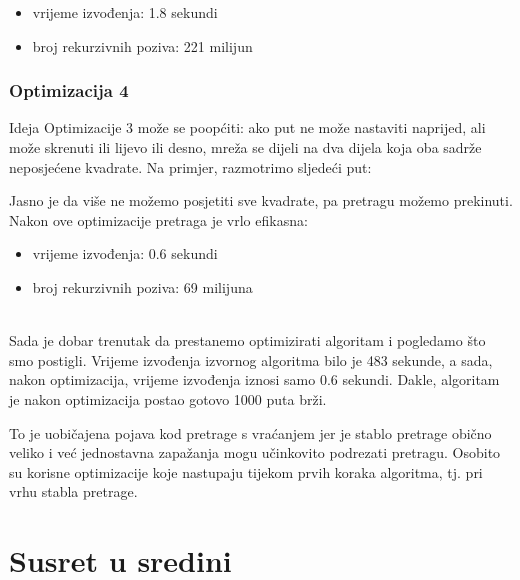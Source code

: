 \begin{itemize}
\item
vrijeme izvođenja: 1.8 sekundi
\item
broj rekurzivnih poziva: 221 milijun
\end{itemize}

\subsubsection{Optimizacija 4}

Ideja Optimizacije 3
može se poopćiti:
ako put ne može nastaviti naprijed,
ali može skrenuti ili lijevo ili desno,
mreža se dijeli na dva dijela
koja oba sadrže neposjećene kvadrate.
Na primjer, razmotrimo sljedeći put:

\begin{center}
\end{center}
Jasno je da više ne možemo posjetiti sve kvadrate,
pa pretragu možemo prekinuti.
Nakon ove optimizacije pretraga je
vrlo efikasna:

\begin{itemize}
\item
vrijeme izvođenja: 0.6 sekundi
\item
broj rekurzivnih poziva: 69 milijuna
\end{itemize}

~\\
Sada je dobar trenutak da prestanemo optimizirati
algoritam i pogledamo što smo postigli.
Vrijeme izvođenja izvornog algoritma
bilo je 483 sekunde,
a sada, nakon optimizacija,
vrijeme izvođenja iznosi samo 0.6 sekundi.
Dakle, algoritam je nakon optimizacija postao
gotovo 1000 puta brži.

To je uobičajena pojava kod pretrage s vraćanjem
jer je stablo pretrage obično veliko
i već jednostavna zapažanja mogu učinkovito
podrezati pretragu.
Osobito su korisne optimizacije koje
nastupaju tijekom prvih koraka algoritma,
tj. pri vrhu stabla pretrage.

\section{Susret u sredini}

